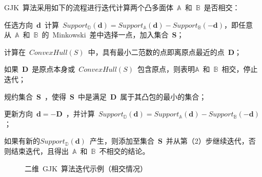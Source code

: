 GJK~算法采用如下的流程\cite{ericson2005real}进行迭代计算两个凸多面体~$\mathbb{A}$~和~$\mathbb{B}$~是否相交：

\begin{inparaenum}[(1)]
  \item 任选方向~$\bm{d}$~计算~$Support_\mathbb{D}(\bm{d}) = Support_\mathbb{A}(\bm{d}) - Support_\mathbb{B}(-\bm{d})$，即任意从~$\mathbb{A}$~和~$\mathbb{B}$~的~Minkowski~差中选择一点，加入集合~$\bm{S}$；\\ \indent
  \item 计算在~$ConvexHull(S)$~中，具有最小二范数的点即离原点最近的点~$\bm{D}$； \\ \indent
  \item 如果~$\bm{D}$~是原点本身或~$ConvexHull(S)$~包含原点，则表明$\mathbb{A}$~和~$\mathbb{B}$~相交，停止迭代；\\ \indent
  \item 规约集合~$\bm{S}$~，使得~$\bm{S}$~中是满足~$\bm{D}$~属于其凸包的最小的集合；\\ \indent
  \item 更新方向~$\bm{d} = -\bm{D}$~，并计算~$Support_\mathbb{D}(\bm{d}) = Support_\mathbb{A}(\bm{d}) - Support_\mathbb{B}(-\bm{d})$；\\ \indent
  \item 如果有新的$Support_\mathbb{D}(\bm{d})$~产生，则添加至集合~$\bm{S}$~并从第（2）步继续迭代，否则结束迭代，且得出~$\mathbb{A}$~和~$\mathbb{B}$~不相交的结论。
\end{inparaenum}

\begin{figure}[H]
\centering
{} 
\caption{二维~GJK~算法迭代示例（相交情况）}
\label{fig:gjk:example:2d:intersection:iterator}
\end{figure}


